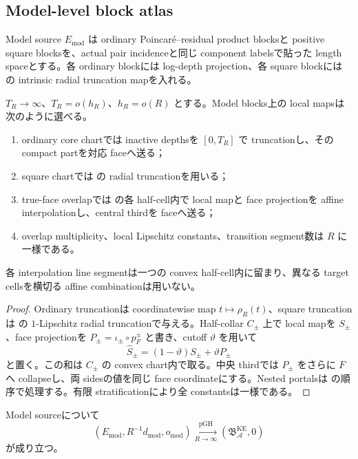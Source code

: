 \documentclass[11pt,a4paper]{ltjsarticle}
\newcommand{\cA}{\mathcal A}\newcommand{\cB}{\mathcal B}\newcommand{\cC}{\mathcal C}
\newcommand{\BKE}{\mathfrak B_{\cA}^{\mathrm{KE}}}
\theoremstyle{plain}
\theoremstyle{definition}
\theoremstyle{remark}
\begin{document}
\subsection{Model-level block atlas}
Model source $E_{\mathrm{mod}}$ は ordinary Poincar\'e--residual product blocksと positive square blocksを、actual pair incidenceと同じ component labelsで貼った length spaceとする。各 ordinary blockには log-depth projection、各 square blockには  の intrinsic radial truncation mapを入れる。

\begin{proposition}\label{prop:explicit-model-atlas}
$T_R\to\infty$、$T_R=o(h_R)$、$h_R=o(R)$ とする。Model blocks上の local mapsは次のように選べる。
\begin{enumerate}[label=(M\arabic*)]
 \item ordinary core chartでは inactive depthsを $[0,T_R]$ で truncationし、その compact partを対応 faceへ送る；
 \item square chartでは  の radial truncationを用いる；
 \item true-face overlapでは  の各 half-cell内で local mapと face projectionを affine interpolationし、central thirdを faceへ送る；
 \item overlap multiplicity、local Lipschitz constants、transition segment数は $R$ に一様である。
\end{enumerate}
各 interpolation line segmentは一つの convex half-cell内に留まり、異なる target cellsを横切る affine combinationは用いない。
\end{proposition}

\begin{proof}
Ordinary truncationは coordinatewise map $t\mapsto\rho_R(t)$、square truncationは  の $1$-Lipschitz radial truncationで与える。Half-collar $C_\pm$ 上で local mapを $S_\pm$、face projectionを $P_\pm=\iota_\pm\circ p_F^\pm$ と書き、cutoff $\vartheta$ を用いて
\[
 \widehat S_\pm=(1-\vartheta)S_\pm+\vartheta P_\pm
\]
と置く。この和は $C_\pm$ の convex chart内で取る。中央 thirdでは $P_\pm$ をさらに $F$ へ collapseし、両 sidesの値を同じ face coordinateにする。Nested portalsは  の順序で処理する。有限 stratificationにより全 constantsは一様である。
\end{proof}

\begin{corollary}\label{cor:model-pgh}
Model sourceについて
\[
 (E_{\mathrm{mod}},R^{-1}d_{\mathrm{mod}},o_{\mathrm{mod}})
 \xrightarrow[R\to\infty]{\mathrm{pGH}}
 (\BKE,0)
\]
が成り立つ。
\end{corollary}
\end{document}
